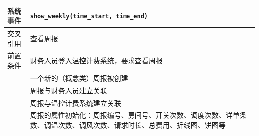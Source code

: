 \documentclass[black,normal,cn]{elegantnote}
\newcommand{\code}[1]{\colorbox{light-gray}{\texttt{#1}}}
\begin{document}
\begin{center}
    \begin{tabular}{|>{\centering}m{}|m{}|}
        \hline
        系统事件                  & \multicolumn{1}{l|}{\code{show\_weekly(time\_start, time\_end)}}                                                       \\
        \hline
        交叉引用                  & 查看周报                                                                                                               \\
        \hline
        前置条件                  & 财务人员登入温控计费系统，要求查看周报                                                                                 \\
        \hline
        \multirow{4}{*}{后置条件} & 一个新的（概念类）周报被创建                                                                                           \\
        \cline{2-2}
                                  & 周报与财务人员建立关联                                                                                                 \\
        \cline{2-2}
                                  & 周报与温控计费系统建立关联                                                                                             \\
        \cline{2-2}
                                  & 周报的属性初始化：周报编号、房间号、开关次数、调度次数、详单条数、调温次数、调风次数、请求时长、总费用、折线图、饼图等 \\
        \hline
    \end{tabular}
\end{center}
\end{document}
